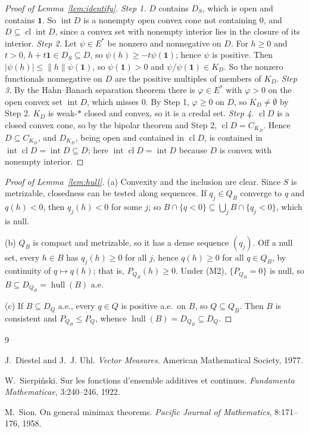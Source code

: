 \documentclass[11pt]{article}
\newcommand{\one}{\mathbf{1}}
\newcommand{\hull}{\operatorname{hull}}
\DeclareMathOperator{\cl}{cl}
\DeclareMathOperator{\inter}{int}
\theoremstyle{plain}
\theoremstyle{definition}
\theoremstyle{remark}
\begin{document}
\begin{proof}[Proof of Lemma~\ref{lem:identify}]
\emph{Step 1.} $D$ contains $D_S$, which is open and contains $\one$. So $\inter D$ is a
nonempty open convex cone not containing $0$, and $D\subseteq\cl\inter D$, since a convex set
with nonempty interior lies in the closure of its interior.
\emph{Step 2.} Let $\psi\in E^\ast$ be nonzero and nonnegative on $D$. For $h\ge0$ and $t>0$,
$h+t\one\in D_S\subseteq D$, so $\psi(h)\ge-t\psi(\one)$; hence $\psi$ is positive. Then
$|\psi(h)|\le\|h\|\psi(\one)$, so $\psi(\one)>0$ and $\psi/\psi(\one)\in K_D$. So the nonzero
functionals nonnegative on $D$ are the positive multiples of members of $K_D$.
\emph{Step 3.} By the Hahn--Banach separation theorem there is $\varphi\in E^\ast$ with
$\varphi>0$ on the open convex set $\inter D$, which misses $0$. By Step 1, $\varphi\ge0$ on $D$,
so $K_D\ne\emptyset$ by Step 2. $K_D$ is weak-$\ast$ closed and convex, so it is a credal set.
\emph{Step 4.} $\cl D$ is a closed convex cone, so by the bipolar theorem and Step 2, $\cl D=
C_{K_D}$. Hence $D\subseteq C_{K_D}$, and $D_{K_D}$, being open and contained in $\cl D$, is
contained in $\inter\cl D=\inter D\subseteq D$; here $\inter\cl D=\inter D$ because $D$ is convex
with nonempty interior.
\end{proof}

\begin{proof}[Proof of Lemma~\ref{lem:hull}]
(a) Convexity and the inclusion are clear. Since $S$ is metrizable, closedness can be tested
along sequences. If $q_j\in Q_B$ converge to $q$ and $q(h)<0$, then $q_j(h)<0$ for some $j$; so
$B\cap\{q<0\}\subseteq\bigcup_jB\cap\{q_j<0\}$, which is null.

(b) $Q_B$ is compact and metrizable, so it has a dense sequence $(q_j)$. Off a null set, every
$h\in B$ has $q_j(h)\ge0$ for all $j$, hence $q(h)\ge0$ for all $q\in Q_B$, by continuity of
$q\mapsto q(h)$; that is, $P_{Q_B}(h)\ge0$. Under (M2), $\{P_{Q_B}=0\}$ is null, so
$B\subseteq D_{Q_B}=\hull(B)$ a.e.

(c) If $B\subseteq D_Q$ a.e., every $q\in Q$ is positive a.e.\ on $B$, so $Q\subseteq Q_B$.
Then $B$ is consistent and $P_{Q_B}\le P_Q$, whence $\hull(B)=D_{Q_B}\subseteq D_Q$.
\end{proof}

\begin{thebibliography}{9}

J.~Diestel and J.~J. Uhl.
\newblock \emph{Vector Measures}.
\newblock American Mathematical Society, 1977.

W.~Sierpi\'nski.
\newblock Sur les fonctions d'ensemble additives et continues.
\newblock \emph{Fundamenta Mathematicae}, 3:240--246, 1922.

M.~Sion.
\newblock On general minimax theorems.
\newblock \emph{Pacific Journal of Mathematics}, 8:171--176, 1958.

\end{thebibliography}
\end{document}
